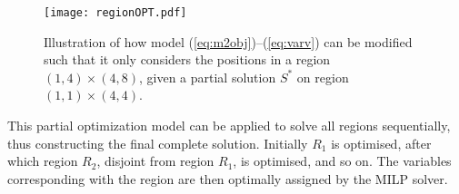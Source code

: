 \documentclass[preprint,12pt]{elsarticle}
\begin{document}
{%
\begin{figure}
\centering
\texttt{[image: regionOPT.pdf]}
\caption{Illustration of how model (\ref{eq:m2obj})--(\ref{eq:varv}) can be modified such that it only considers the positions in a region $(1,4)\times(4,8)$, given a partial solution $S^\ast$ on region $(1,1)\times(4,4)$.\label{fig:partialmip}
}
\end{figure}
This partial optimization model can be applied to solve all regions sequentially, thus constructing the final complete solution.
Initially $R_1$ is optimised, after which region $R_2$, disjoint from region $R_1$, is optimised, and so on.
The variables corresponding with the region are then optimally assigned by the MILP solver.
%
}
\end{document}
